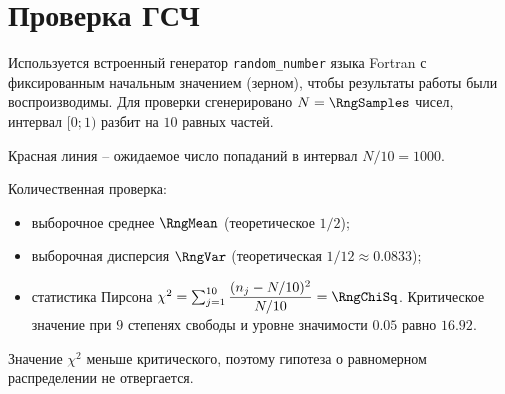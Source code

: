     \section*{Проверка ГСЧ}
        Используется встроенный генератор \texttt{random\_number} языка Fortran с фиксированным начальным значением (зерном), чтобы результаты работы были воспроизводимы. Для проверки сгенерировано $N = \RngSamples$ чисел, интервал $[0; 1)$ разбит на $10$ равных частей.
        \begin{center}
        \end{center}
        Красная линия -- ожидаемое число попаданий в интервал $N/10 = 1000$.

        Количественная проверка:
        \begin{itemize}
            \item выборочное среднее $\RngMean$ (теоретическое $1/2$);
            \item выборочная дисперсия $\RngVar$ (теоретическая $1/12 \approx 0.0833$);
            \item статистика Пирсона $\chi^2 = \sum_{j=1}^{10} \dfrac{(n_j - N/10)^2}{N/10} = \RngChiSq$. Критическое значение при $9$ степенях свободы и уровне значимости $0.05$ равно $16.92$.
        \end{itemize}
        Значение $\chi^2$ меньше критического, поэтому гипотеза о равномерном распределении не отвергается.

